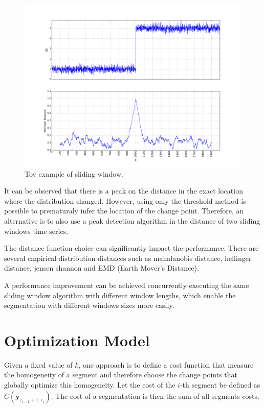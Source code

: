 \begin{figure}[H]
    \centering
    \includegraphics[width=1.0\textwidth]{./figures/sliding_window_toy_example.png}
    \caption{Toy example of sliding window.}
    \label{fig:sliding_window_toy_example}
\end{figure}

It can be observed that there is a peak on the distance in the exact location where the distribution changed. However, using only the threshold method is possible to prematuraly infer the location of the change point. Therefore, an alternative is to also use a peak detection algorithm in the distance of two sliding windows time series.

The distance function choice can significantly impact the performance. There are several empirical distribution distances such as mahalanobis distance, hellinger distance, jensen shannon and EMD (Earth Mover's Distance).  

A performance improvement can be achieved concurrently executing the same sliding window algorithm with different window lengths, which enable the segmentation with different windows sizes more easily.

\section{Optimization Model}  

Given a fixed value of $k$, one approach is to define a cost function that measure the homogeneity of a segment and therefore choose the change points that globally optimize this homogeneity. Let the cost of the $i$-th segment be defined as $C(\mathbf{y}_{\tau_{i - 1} + 1 : \tau_{i}})$. The cost of a segmentation is then the sum of all segments costs.


